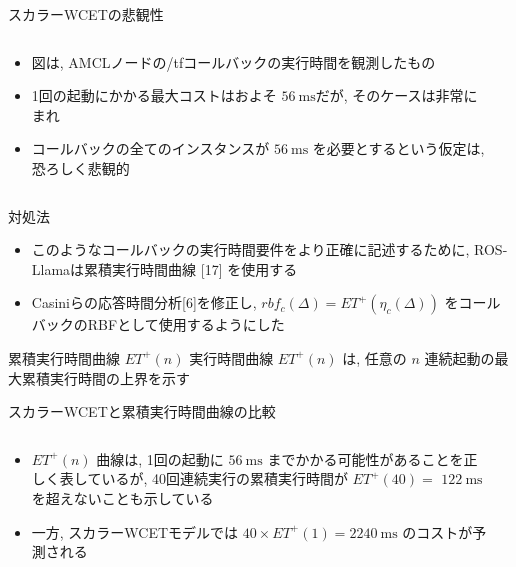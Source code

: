 \begin{frame}{スカラーWCETの悲観性}
    \begin{columns}
        \begin{column}{0.5\textwidth}
            \begin{itemize}
                \item 図は, AMCLノードの/tfコールバックの実行時間を観測したもの
                \item 1回の起動にかかる最大コストはおよそ $56 \mathrm{~ms}$だが, そのケースは非常にまれ
                \item コールバックの全てのインスタンスが $56 \mathrm{~ms}$ を必要とするという仮定は, 恐ろしく悲観的
            \end{itemize}
        \end{column}
        \begin{column}{0.5\textwidth}
        \end{column}
    \end{columns}
\end{frame}

\begin{frame}{対処法}
    \begin{itemize}
        \item このようなコールバックの実行時間要件をより正確に記述するために, ROS-Llamaは累積実行時間曲線 [17] を使用する
        \item Casiniらの応答時間分析[6]を修正し, $r b f_{c}(\Delta)=E T^{+}\left(\eta_{c}(\Delta)\right)$ をコールバックのRBFとして使用するようにした
    \end{itemize}
    \begin{block}{累積実行時間曲線 $E T^{+}(n)$}
        実行時間曲線 $E T^{+}(n)$ は, 任意の $n$ 連続起動の最大累積実行時間の上界を示す
    \end{block}
\end{frame}

\begin{frame}{スカラーWCETと累積実行時間曲線の比較}
    \begin{columns}
        \begin{column}{0.5\textwidth}
            \begin{itemize}
                \item $E T^{+}(n)$ 曲線は, 1回の起動に $56 \mathrm{~ms}$ までかかる可能性があることを正しく表しているが, 40回連続実行の累積実行時間が $E T^{+}(40)=$  $122 \mathrm{~ms}$ を超えないことも示している
                \item 一方, スカラーWCETモデルでは $40 \times E T^{+}(1)=2240 \mathrm{~ms}$ のコストが予測される
            \end{itemize}
        \end{column}
        \begin{column}{0.5\textwidth}
        \end{column}
    \end{columns}
\end{frame}


